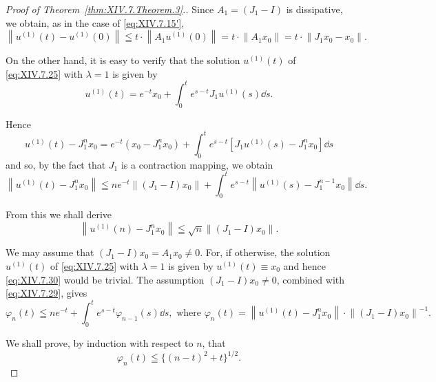 \begin{proof}[Proof of Theorem~\ref{thm:XIV.7.Theorem.3}.]
Since $A_{1} = (J_{1} - I)$ is dissipative, we obtain, as in the case of \eqref{eq:XIV.7.15'},
\begin{equation}\label{eq:XIV.7.27}
\left\| u ^{(1)} (t) - u ^{(1)} (0) \right\| \leqq t \cdot \left\| A _{1} u ^{(1)} (0) \right\| = t \cdot \left\| A _{1} x _{0} \right\| = t \cdot \left\| J _{1} x _{0} - x _{0} \right\|.
\end{equation}

On the other hand, it is easy to verify that the solution $u^{(1)}(t)$ of \eqref{eq:XIV.7.25} with $\lambda = 1$ is given by 
\begin{equation}\label{eq:XIV.7.28}
u ^{(1)} (t) = e ^{-t} x _{0} + \int_{0} ^{t} e ^{s-t} J _{1} u ^{(1)} (s) \dd s.
\end{equation}

Hence 
\[
u ^{(1)} (t) - J _{1} ^{n} x _{0} = e ^{-t} \left(x _{0} - J _{1} ^{n} x _{0}\right) + \int_{0} ^{t} e ^{s-t} \left[ J _{1} u ^{(1)} (s) - J _{1} ^{n} x _{0} \right] \dd s
\]
and so, by the fact that $J_{1}$ is a contraction mapping, we obtain 
\begin{equation}\label{eq:XIV.7.29}
\left\| u ^{(1)} (t) - J _{1} ^{n} x _{0} \right\| \leqq n e ^{-t} \left\| \left(J _{1} - I\right) x _{0} \right\| + \int_{0} ^{t} e ^{s-t} \left\| u ^{(1)} (s) - J _{1} ^{n-1} x _{0} \right\| \dd s.
\end{equation}

From this we shall derive 
\begin{equation}\label{eq:XIV.7.30}
\left\| u ^{(1)} (n) - J _{1} ^{n} x _{0} \right\| \leqq \sqrt {n} \left\| (J _{1} - I) x _{0} \right\|.
\end{equation}

We may assume that $(J_{1}-I)x_{0}=A_{1}x_{0}\neq0$. For, if otherwise, the solution $u^{(1)}(t)$ of \eqref{eq:XIV.7.25} with $\lambda=1$ is given by $u^{(1)}(t)\equiv x_{0}$ and hence \eqref{eq:XIV.7.30} would be trivial. The assumption $(J_{1}-I)x_{0}\neq0$, combined with \eqref{eq:XIV.7.29}, gives 
\begin{equation}\varphi_{n} (t) \leqq n e ^{-t} + \int_{0} ^{t} e ^{s-t} \varphi_{n-1} (s) \dd s, \text{ where } \varphi_{n} (t) = \left\| u ^{(1)} (t) - J _{1} ^{n} x _{0} \right\| \cdot \left\| \left(J _{1} - I\right) x _{0} \right\| ^{-1}. \label{eq:XIV.7.31}\end{equation}

We shall prove, by induction with respect to $n$, that 
\begin{equation}\label{eq:XIV.7.32}
\varphi_{n} (t) \leqq \{(n - t) ^{2} + t \} ^{1/2}.
\end{equation}


\end{proof}
